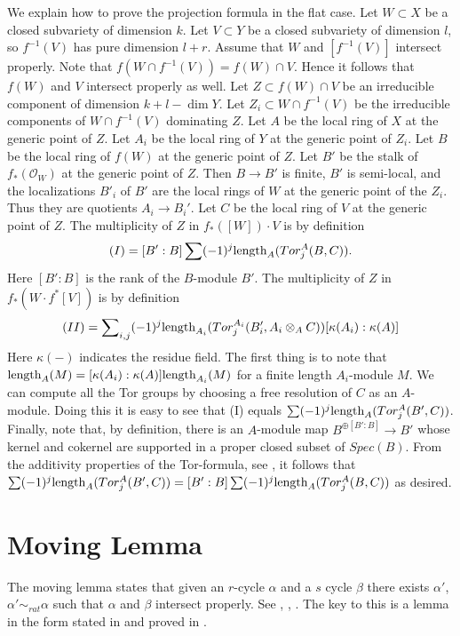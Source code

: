 \medskip\noindent
We explain how to prove the projection formula in the flat case.
Let $W \subset X$ be a closed subvariety of dimension $k$.
Let $V \subset Y$ be a closed subvariety of dimension $l$,
so $f^{-1}(V)$ has pure dimension $l+r$.
Assume that $W$ and $[f^{-1}(V)]$ intersect properly. Note that
$f(W \cap f^{-1}(V)) = f(W) \cap V$. Hence it follows
that $f(W)$ and $V$ intersect properly as well. Let
$Z \subset f(W) \cap V$ be an irreducible component
of dimension $k+l-\dim Y$. Let $Z_i \subset W\cap f^{-1}(V)$
be the irreducible components of $W\cap f^{-1}(V)$
dominating $Z$. 
Let $A$ be the local ring of $X$ at the generic point of $Z$.
Let $A_i$ be the local ring of $Y$ at the generic point of $Z_i$.
Let $B$ be the local ring of $f(W)$ at the generic point of $Z$.
Let $B'$ be the stalk of $f_*(\mathcal{O}_W)$ at the generic point
of $Z$. Then $B \to B'$ is finite, $B'$ is semi-local, and the
localizations $B'_i$ of $B'$ are the local rings of $W$ at the generic
point of the $Z_i$. Thus they are quotients $A_i \to B_i'$.
Let $C$ be the local ring of $V$ at the generic point of $Z$.
The multiplicity of $Z$ in $f_*([W])\cdot V$ is by definition
$$
(I) = [B' : B] \sum (-1)^j \hbox{length}_{A}(Tor^A_j(B,C)).
$$
Here $[B':B]$ is the rank of the $B$-module $B'$.
The multiplicity of $Z$ in $f_*( W \cdot f^*[V])$ is
by definition
$$
(II) = \sum\nolimits_{i,j} (-1)^j
\hbox{length}_{A_i}(Tor^{A_i}_j(B'_i, A_i\otimes_A C))
[\kappa(A_i):\kappa(A)]
$$
Here $\kappa(-)$ indicates the residue field.
The first thing is to note that
$\hbox{length}_A(M) = [\kappa(A_i):\kappa(A)]\hbox{length}_{A_i}(M)$
for a finite length $A_i$-module $M$.
We can compute all the Tor groups by choosing a free resolution
of $C$ as an $A$-module. Doing this it is easy to see that
(I) equals $\sum (-1)^j \hbox{length}_{A}(Tor^A_j(B', C))$.
Finally, note that, by definition, there is an $A$-module map
$B^{\oplus [B':B]} \to B'$ whose kernel and cokernel are
supported in a proper closed subset of $Spec(B)$. From the
additivity properties of the Tor-formula, see
\cite[Chapter V]{Serre_algebre_locale},
it follows that $\sum (-1)^j \hbox{length}_{A}(Tor^A_j(B', C)) =
[B':B] \sum (-1)^j \hbox{length}_{A}(Tor^A_j(B, C))$ as desired.


\section{Moving Lemma}
\label{section-moving-lemma}

\noindent
The moving lemma states that given an $r$-cycle $\alpha$ and a $s$ cycle
$\beta$ there exists $\alpha'$, $\alpha' \sim_{rat} \alpha$ such that
$\alpha$ and $\beta$ intersect properly.
See \cite{Samuel}, \cite{ChevalleyI}, \cite{ChevalleyII}.
The key to this is a lemma in the form stated in
\cite[Example 11.4.1]{F} and proved in \cite{Roberts}.

